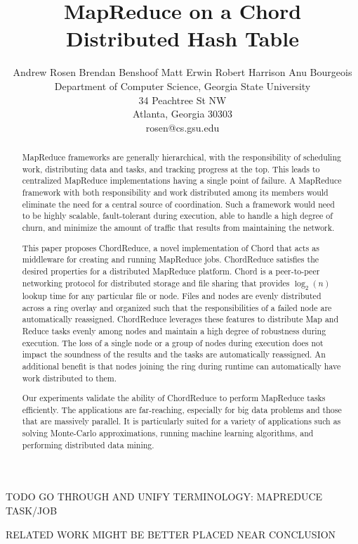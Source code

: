 \documentclass[conference, compsocconf, letterpaper]{IEEEtran}
\title{MapReduce on a Chord Distributed Hash Table}
\author{
Andrew Rosen \qquad Brendan Benshoof \qquad Matt Erwin \qquad Robert Harrison \qquad Anu Bourgeois  \\Department of Computer Science, Georgia State University\\ 34 Peachtree St NW \\ Atlanta, Georgia 30303\\  rosen@cs.gsu.edu }
\begin{document}
\maketitle

\begin{abstract}

MapReduce frameworks are generally hierarchical, with the responsibility of scheduling work, distributing data and tasks, and tracking progress at the top.  This leads to centralized MapReduce implementations having a single point of failure.  A MapReduce framework with both responsibility and work distributed among its members would eliminate the need for a central source of coordination.  Such a framework would need to be highly scalable, fault-tolerant during execution, able to handle a high degree of churn, and minimize the amount of traffic that results from maintaining the network. 

This paper proposes ChordReduce, a novel implementation of Chord that acts as middleware for creating and running MapReduce jobs. ChordReduce satisfies the desired properties for a distributed MapReduce platform. Chord is a peer-to-peer networking protocol for distributed storage and file sharing that provides $\log_{2}(n)$ lookup time for any particular file or node.  Files and nodes are evenly distributed across a ring overlay and organized such that the responsibilities of a failed node are automatically reassigned.  ChordReduce leverages these features to distribute Map and Reduce tasks evenly among nodes and maintain a high degree of robustness during execution.  The loss of a single node or a group of nodes during execution does not impact the soundness of the results and the tasks are automatically reassigned.  An additional benefit is that nodes joining the ring during runtime can automatically have work distributed to them.

Our experiments validate the ability of ChordReduce to perform MapReduce tasks efficiently. The applications are far-reaching, especially for big data problems and those that are massively parallel.  It is particularly suited for a variety of applications such as solving Monte-Carlo approximations, running machine learning algorithms, and performing distributed data mining. 


\end{abstract}

TODO GO THROUGH AND UNIFY TERMINOLOGY:  MAPREDUCE TASK/JOB

RELATED WORK MIGHT BE BETTER PLACED NEAR CONCLUSION
\end{document}
